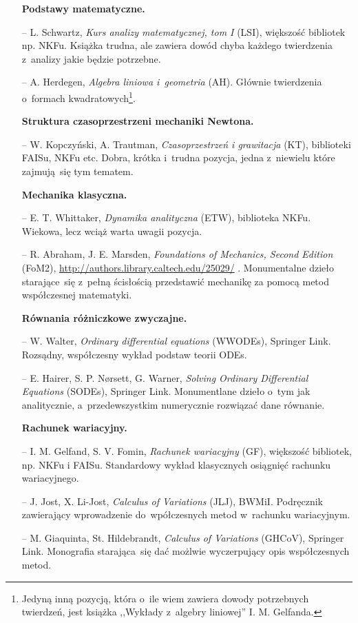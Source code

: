 \documentclass[a4paper,11pt]{article}
\begin{document}
\begin{itemize}
\item[] \textbf{Podstawy matematyczne.}
\item[--] L. Schwartz, \emph{Kurs analizy matematycznej, tom I} (LSI), większość bibliotek np. NKFu. Książka trudna, ale zawiera dowód chyba każdego twierdzenia z~analizy jakie będzie potrzebne.
\item[--] A. Herdegen, \emph{Algebra liniowa i~geometria} (AH). Głównie twierdzenia o~formach kwadratowych\footnote{Jedyną inną pozycją, która o~ile wiem zawiera dowody potrzebnych twierdzeń, jest książka ,,Wykłady z~algebry liniowej'' I. M. Gelfanda.}.
\item[] \textbf{Struktura czasoprzestrzeni mechaniki Newtona.}
\item[--] W. Kopczyński, A. Trautman, \emph{Czasoprzestrzeń i grawitacja} (KT), biblioteki FAISu, NKFu etc. Dobra, krótka i~trudna pozycja, jedna z~niewielu które zajmują~się tym tematem.
\item[] \textbf{Mechanika klasyczna.}
\item[--] E. T. Whittaker, \emph{Dynamika analityczna} (ETW), biblioteka NKFu. Wiekowa, lecz wciąż warta uwagii pozycja.
\item[--] R. Abraham, J. E. Marsden, \emph{Foundations of Mechanics, Second Edition} (FoM2), \url{http://authors.library.caltech.edu/25029/} . Monumentalne dzieło starające~się z~pełną ścisłością przedstawić mechanikę za pomocą metod współczesnej matematyki.
\item[] \textbf{Równania różniczkowe zwyczajne.}
\item[--] W. Walter, \emph{Ordinary differential equations} (WWODEs), Springer Link. Rozsądny, współczesny wykład podstaw teorii ODEs.
\item[--] E. Hairer, S. P. N\o rsett, G. Warner, \emph{Solving Ordinary Differential Equations} (SODEs), Springer Link. Monumentlane dzieło o~tym jak analitycznie, a~przedewszystkim numerycznie rozwiązać dane równanie. 
\item[] \textbf{Rachunek wariacyjny.}
\item[--] I. M. Gelfand, S. V. Fomin, \emph{Rachunek wariacyjny} (GF), większość bibliotek, np. NKFu i FAISu. Standardowy wykład klasycznych osiągnięć rachunku wariacyjnego.
\item[--] J. Jost, X. Li-Jost, \emph{Calculus of Variations} (JLJ), BWMiI. Podręcznik zawierający wprowadzenie do~wpółczesnych metod w~rachunku wariacyjnym.
\item[--]  M. Giaquinta, St. Hildebrandt, \emph{Calculus of Variations} (GHCoV), Springer Link. Monografia starająca~się dać możlwie wyczerpujący opis współczesnych metod.

\end{itemize}
\end{document}
